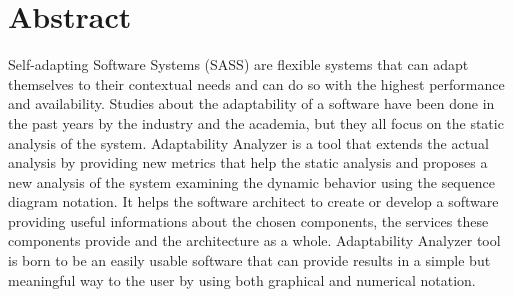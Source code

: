 \chapter*{Abstract}
\lettrine{S}{}elf-adapting Software Systems (SASS) are flexible systems that can adapt themselves to their contextual needs and can do so with the highest performance and availability.
\newline
\newline
\indent Studies about the adaptability of a software have been done in the past years by the industry and the academia, but they all focus on the static analysis of the system. 
\newline
\newline
\indent Adaptability Analyzer is a tool that extends the actual analysis by providing new metrics that help the static analysis and proposes a new analysis of the system examining the dynamic behavior using the sequence diagram notation. 
\newline
\newline
\indent It helps the software architect to create or develop a software providing useful informations about the chosen components, the services these components provide and the architecture as a whole. 
\newline
\newline
\indent Adaptability Analyzer tool is born to be an easily usable software that can provide results in a simple but meaningful way to the user by using both graphical and numerical notation.
